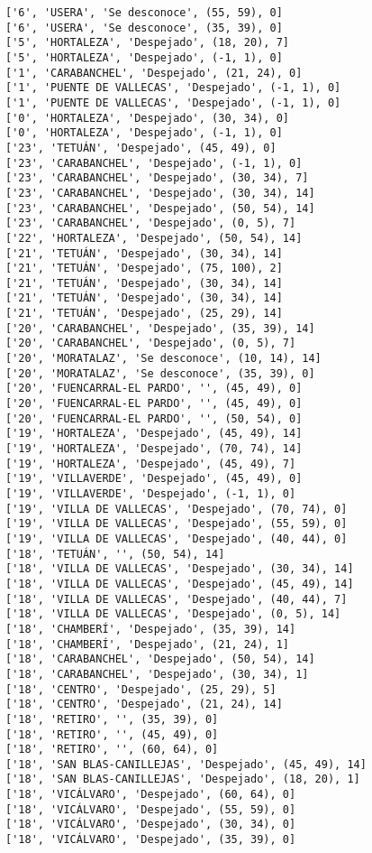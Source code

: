 \documentclass[11pt]{article}
\begin{document}
\begin{Verbatim}[commandchars=\\\{\}]
['6', 'USERA', 'Se desconoce', (55, 59), 0]
['6', 'USERA', 'Se desconoce', (35, 39), 0]
['5', 'HORTALEZA', 'Despejado', (18, 20), 7]
['5', 'HORTALEZA', 'Despejado', (-1, 1), 0]
['1', 'CARABANCHEL', 'Despejado', (21, 24), 0]
['1', 'PUENTE DE VALLECAS', 'Despejado', (-1, 1), 0]
['1', 'PUENTE DE VALLECAS', 'Despejado', (-1, 1), 0]
['0', 'HORTALEZA', 'Despejado', (30, 34), 0]
['0', 'HORTALEZA', 'Despejado', (-1, 1), 0]
['23', 'TETUÁN', 'Despejado', (45, 49), 0]
['23', 'CARABANCHEL', 'Despejado', (-1, 1), 0]
['23', 'CARABANCHEL', 'Despejado', (30, 34), 7]
['23', 'CARABANCHEL', 'Despejado', (30, 34), 14]
['23', 'CARABANCHEL', 'Despejado', (50, 54), 14]
['23', 'CARABANCHEL', 'Despejado', (0, 5), 7]
['22', 'HORTALEZA', 'Despejado', (50, 54), 14]
['21', 'TETUÁN', 'Despejado', (30, 34), 14]
['21', 'TETUÁN', 'Despejado', (75, 100), 2]
['21', 'TETUÁN', 'Despejado', (30, 34), 14]
['21', 'TETUÁN', 'Despejado', (30, 34), 14]
['21', 'TETUÁN', 'Despejado', (25, 29), 14]
['20', 'CARABANCHEL', 'Despejado', (35, 39), 14]
['20', 'CARABANCHEL', 'Despejado', (0, 5), 7]
['20', 'MORATALAZ', 'Se desconoce', (10, 14), 14]
['20', 'MORATALAZ', 'Se desconoce', (35, 39), 0]
['20', 'FUENCARRAL-EL PARDO', '', (45, 49), 0]
['20', 'FUENCARRAL-EL PARDO', '', (45, 49), 0]
['20', 'FUENCARRAL-EL PARDO', '', (50, 54), 0]
['19', 'HORTALEZA', 'Despejado', (45, 49), 14]
['19', 'HORTALEZA', 'Despejado', (70, 74), 14]
['19', 'HORTALEZA', 'Despejado', (45, 49), 7]
['19', 'VILLAVERDE', 'Despejado', (45, 49), 0]
['19', 'VILLAVERDE', 'Despejado', (-1, 1), 0]
['19', 'VILLA DE VALLECAS', 'Despejado', (70, 74), 0]
['19', 'VILLA DE VALLECAS', 'Despejado', (55, 59), 0]
['19', 'VILLA DE VALLECAS', 'Despejado', (40, 44), 0]
['18', 'TETUÁN', '', (50, 54), 14]
['18', 'VILLA DE VALLECAS', 'Despejado', (30, 34), 14]
['18', 'VILLA DE VALLECAS', 'Despejado', (45, 49), 14]
['18', 'VILLA DE VALLECAS', 'Despejado', (40, 44), 7]
['18', 'VILLA DE VALLECAS', 'Despejado', (0, 5), 14]
['18', 'CHAMBERÍ', 'Despejado', (35, 39), 14]
['18', 'CHAMBERÍ', 'Despejado', (21, 24), 1]
['18', 'CARABANCHEL', 'Despejado', (50, 54), 14]
['18', 'CARABANCHEL', 'Despejado', (30, 34), 1]
['18', 'CENTRO', 'Despejado', (25, 29), 5]
['18', 'CENTRO', 'Despejado', (21, 24), 14]
['18', 'RETIRO', '', (35, 39), 0]
['18', 'RETIRO', '', (45, 49), 0]
['18', 'RETIRO', '', (60, 64), 0]
['18', 'SAN BLAS-CANILLEJAS', 'Despejado', (45, 49), 14]
['18', 'SAN BLAS-CANILLEJAS', 'Despejado', (18, 20), 1]
['18', 'VICÁLVARO', 'Despejado', (60, 64), 0]
['18', 'VICÁLVARO', 'Despejado', (55, 59), 0]
['18', 'VICÁLVARO', 'Despejado', (30, 34), 0]
['18', 'VICÁLVARO', 'Despejado', (35, 39), 0]

\end{Verbatim}
\end{document}
